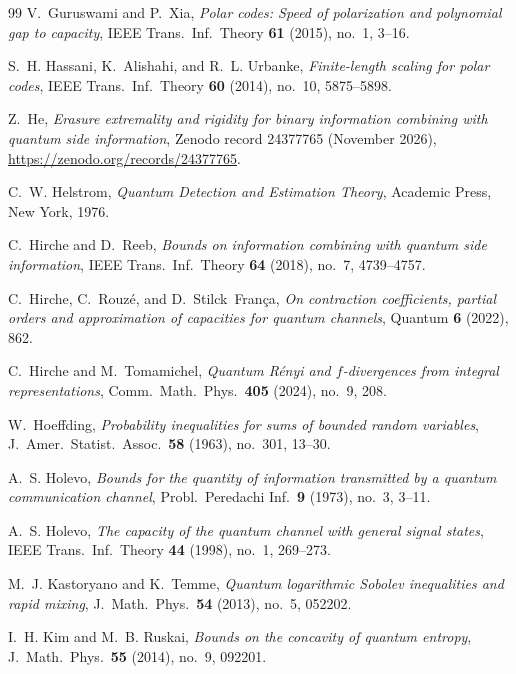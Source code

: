 \documentclass[10pt,a4paper]{article}
\numberwithin{equation}{section}
\theoremstyle{plain}
\theoremstyle{definition}
\theoremstyle{remark}
\begin{document}
\begin{thebibliography}{99}
V.~Guruswami and P.~Xia, \emph{Polar codes: Speed of polarization and polynomial gap to capacity}, IEEE Trans.\ Inf.\ Theory \textbf{61} (2015), no.~1, 3--16.

S.~H. Hassani, K.~Alishahi, and R.~L. Urbanke, \emph{Finite-length scaling for polar codes}, IEEE Trans.\ Inf.\ Theory \textbf{60} (2014), no.~10, 5875--5898.

Z.~He, \emph{Erasure extremality and rigidity for binary information combining with quantum side information}, Zenodo record 24377765 (November 2026), \url{https://zenodo.org/records/24377765}.

C.~W. Helstrom, \emph{Quantum Detection and Estimation Theory}, Academic Press, New York, 1976.

C.~Hirche and D.~Reeb, \emph{Bounds on information combining with quantum side information}, IEEE Trans.\ Inf.\ Theory \textbf{64} (2018), no.~7, 4739--4757.

C.~Hirche, C.~Rouz\'{e}, and D.~Stilck~Fran\c{c}a, \emph{On contraction coefficients, partial orders and approximation of capacities for quantum channels}, Quantum \textbf{6} (2022), 862.

C.~Hirche and M.~Tomamichel, \emph{Quantum R\'{e}nyi and $f$-divergences from integral representations}, Comm.\ Math.\ Phys.\ \textbf{405} (2024), no.~9, 208.

W.~Hoeffding, \emph{Probability inequalities for sums of bounded random variables}, J.\ Amer.\ Statist.\ Assoc.\ \textbf{58} (1963), no.~301, 13--30.

A.~S. Holevo, \emph{Bounds for the quantity of information transmitted by a quantum communication channel}, Probl.\ Peredachi Inf.\ \textbf{9} (1973), no.~3, 3--11.

A.~S. Holevo, \emph{The capacity of the quantum channel with general signal states}, IEEE Trans.\ Inf.\ Theory \textbf{44} (1998), no.~1, 269--273.

M.~J. Kastoryano and K.~Temme, \emph{Quantum logarithmic Sobolev inequalities and rapid mixing}, J.\ Math.\ Phys.\ \textbf{54} (2013), no.~5, 052202.

I.~H. Kim and M.~B. Ruskai, \emph{Bounds on the concavity of quantum entropy}, J.\ Math.\ Phys.\ \textbf{55} (2014), no.~9, 092201.


\end{thebibliography}
\end{document}
